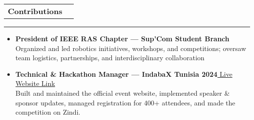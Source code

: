 \documentclass[10pt,a4paper]{article}
\newcommand{\cveventh}[2]
{
\begin{tabular*}{1\textwidth}{p{13.6cm}  x{3.9cm}}
	\textbf{#1}
\end{tabular*}
\vspace{-8pt}
\textcolor{softcol}{\hrule}
\vspace{2pt}
    #2
}
\begin{document}
\vspace{6px}

\cveventh{Contributions}{
\begin{itemize}[noitemsep, topsep=0pt, left=3pt]
    \item \textbf{President of IEEE RAS Chapter — Sup'Com Student Branch}
          \\ Organized and led robotics initiatives, workshops, and competitions; oversaw team logistics, partnerships, and interdisciplinary collaboration
    \item \textbf{Technical \& Hackathon Manager — IndabaX Tunisia 2024}{\href{https://indabaxtunisia.com/2024}{{ Live Website Link} }}
          \\ Built and maintained the official event website, implemented speaker \& sponsor updates, managed registration for 400+ attendees, and made the competition on Zindi.
\end{itemize}
}

\end{document}
